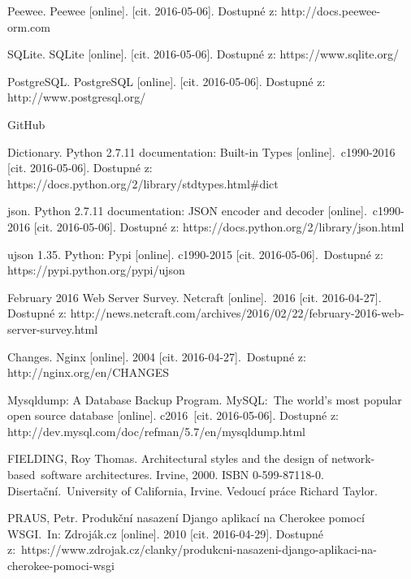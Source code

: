 \begin{thebibliography}{1}
 Peewee. Peewee [online]. [cit. 2016-05-06]. Dostupné z: http://docs.peewee-orm.com

 SQLite. SQLite [online]. [cit. 2016-05-06]. Dostupné z: https://www.sqlite.org/

 PostgreSQL. PostgreSQL [online]. [cit. 2016-05-06]. Dostupné z: http://www.postgresql.org/

 GitHub


 Dictionary. Python 2.7.11 documentation: Built-in Types [online].\
c1990-2016 [cit. 2016-05-06]. Dostupné z: https://docs.python.org/2/library/stdtypes.html\#dict


 json. Python 2.7.11 documentation: JSON encoder and decoder [online].\
c1990-2016 [cit. 2016-05-06]. Dostupné z: https://docs.python.org/2/library/json.html

\bibitem{python_ujson} ujson 1.35. Python: Pypi [online]. c1990-2015 [cit. 2016-05-06].\
Dostupné z: https://pypi.python.org/pypi/ujson


 February 2016 Web Server Survey. Netcraft [online].\
2016 [cit. 2016-04-27]. Dostupné z: http://news.netcraft.com/archives/2016/02/22/february-2016-web-server-survey.html

 Changes. Nginx [online]. 2004 [cit. 2016-04-27].\
Dostupné z: http://nginx.org/en/CHANGES

\bibitem{mysqldump} Mysqldump: A Database Backup Program. MySQL:\
The world's most popular open source database [online]. c2016\
[cit. 2016-05-06]. Dostupné z: http://dev.mysql.com/doc/refman/5.7/en/mysqldump.html

\bibitem{fielding} FIELDING, Roy Thomas. Architectural styles and the design of network-based\
software architectures. Irvine, 2000. ISBN 0-599-87118-0. Disertační.\
University of California, Irvine. Vedoucí práce Richard Taylor.

 PRAUS, Petr. Produkční nasazení Django aplikací na Cherokee pomocí WSGI.\
In: Zdroják.cz [online]. 2010 [cit. 2016-04-29]. Dostupné z:\
https://www.zdrojak.cz/clanky/produkcni-nasazeni-django-aplikaci-na-cherokee-pomoci-wsgi

\end{thebibliography}